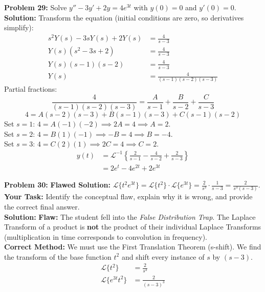 \documentclass[11pt, letterpaper]{article}
\theoremstyle{definition}
\theoremstyle{remark}
\begin{document}
\vspace{1em}
\textbf{Problem 29:} Solve $y'' - 3y' + 2y = 4e^{3t}$ with $y(0) = 0$ and $y'(0) = 0$.
\vspace{0.5em} \\
\textbf{Solution:} Transform the equation (initial conditions are zero, so derivatives simplify):
\begin{align*}
    s^2Y(s) - 3sY(s) + 2Y(s) &= \frac{4}{s - 3} \\[4pt]
    Y(s)(s^2 - 3s + 2) &= \frac{4}{s - 3} \\[4pt]
    Y(s)(s - 1)(s - 2) &= \frac{4}{s - 3} \\[4pt]
    Y(s) &= \frac{4}{(s - 1)(s - 2)(s - 3)}
\end{align*}
Partial fractions:
\[
\frac{4}{(s - 1)(s - 2)(s - 3)} = \frac{A}{s - 1} + \frac{B}{s - 2} + \frac{C}{s - 3}
\]
\[
4 = A(s - 2)(s - 3) + B(s - 1)(s - 3) + C(s - 1)(s - 2)
\]
Set $s = 1$: $4 = A(-1)(-2) \implies 2A = 4 \implies A = 2$. \\ \relax
Set $s = 2$: $4 = B(1)(-1) \implies -B = 4 \implies B = -4$. \\ \relax
Set $s = 3$: $4 = C(2)(1) \implies 2C = 4 \implies C = 2$.
\begin{align*}
    y(t) &= \mathscr{L}^{-1}\left\{\frac{2}{s - 1} - \frac{4}{s - 2} + \frac{2}{s - 3}\right\} \\[4pt]
    &= 2e^t - 4e^{2t} + 2e^{3t}
\end{align*}

\vspace{1em}
\textbf{Problem 30:} \textbf{Flawed Solution:} $\mathscr{L}\{t^2 e^{3t}\} = \mathscr{L}\{t^2\} \cdot \mathscr{L}\{e^{3t}\} = \frac{2}{s^3} \cdot \frac{1}{s-3} = \frac{2}{s^3(s-3)}$. \\
\textbf{Your Task:} Identify the conceptual flaw, explain why it is wrong, and provide the correct final answer.
\vspace{0.5em} \\
\textbf{Solution:} 
\textbf{Flaw:} The student fell into the \textit{False Distribution Trap}. The Laplace Transform of a product is \textbf{not} the product of their individual Laplace Transforms (multiplication in time corresponds to convolution in frequency). \\ \relax
\textbf{Correct Method:} We must use the First Translation Theorem (s-shift). We find the transform of the base function $t^2$ and shift every instance of $s$ by $(s - 3)$.
\begin{align*}
    \mathscr{L}\{t^2\} &= \frac{2}{s^3} \\[4pt]
    \mathscr{L}\{e^{3t}t^2\} &= \frac{2}{(s - 3)^3}
\end{align*}
\end{document}
